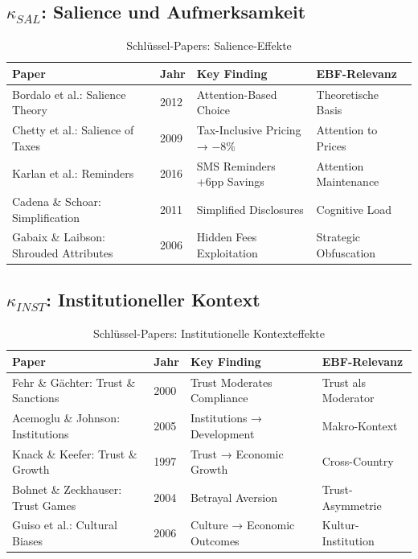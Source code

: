 \subsection{$\kappa_{SAL}$: Salience und Aufmerksamkeit}

\begin{table}[htbp]
\centering
\caption{Schlüssel-Papers: Salience-Effekte}
\label{tab:dr-papers-sal}
\renewcommand{\arraystretch}{1.2}
\scriptsize
\begin{tabular}{@{}p{3.5cm}p{2cm}p{4cm}p{3cm}@{}}
\toprule
\textbf{Paper} & \textbf{Jahr} & \textbf{Key Finding} & \textbf{EBF-Relevanz} \\
\midrule
Bordalo et al.: Salience Theory & 2012 & Attention-Based Choice & Theoretische Basis \\
Chetty et al.: Salience of Taxes & 2009 & Tax-Inclusive Pricing → −8\% & Attention to Prices \\
Karlan et al.: Reminders & 2016 & SMS Reminders +6pp Savings & Attention Maintenance \\
Cadena \& Schoar: Simplification & 2011 & Simplified Disclosures & Cognitive Load \\
Gabaix \& Laibson: Shrouded Attributes & 2006 & Hidden Fees Exploitation & Strategic Obfuscation \\
\bottomrule
\end{tabular}
\end{table}

\subsection{$\kappa_{INST}$: Institutioneller Kontext}

\begin{table}[htbp]
\centering
\caption{Schlüssel-Papers: Institutionelle Kontexteffekte}
\label{tab:dr-papers-inst}
\renewcommand{\arraystretch}{1.2}
\scriptsize
\begin{tabular}{@{}p{3.5cm}p{2cm}p{4cm}p{3cm}@{}}
\toprule
\textbf{Paper} & \textbf{Jahr} & \textbf{Key Finding} & \textbf{EBF-Relevanz} \\
\midrule
Fehr \& Gächter: Trust \& Sanctions & 2000 & Trust Moderates Compliance & Trust als Moderator \\
Acemoglu \& Johnson: Institutions & 2005 & Institutions → Development & Makro-Kontext \\
Knack \& Keefer: Trust \& Growth & 1997 & Trust → Economic Growth & Cross-Country \\
Bohnet \& Zeckhauser: Trust Games & 2004 & Betrayal Aversion & Trust-Asymmetrie \\
Guiso et al.: Cultural Biases & 2006 & Culture → Economic Outcomes & Kultur-Institution \\
\bottomrule
\end{tabular}
\end{table}

